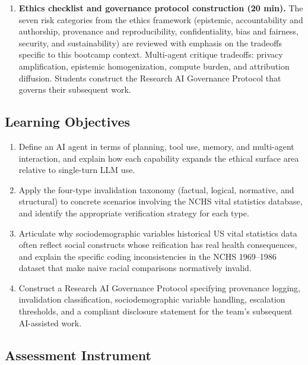 \begin{enumerate}
    \item \textbf{Ethics checklist and governance protocol
    construction (20 min).} The seven risk categories from the
    ethics framework (epistemic, accountability and authorship,
    provenance and reproducibility, confidentiality, bias and
    fairness, security, and sustainability) are reviewed with
    emphasis on the tradeoffs specific to this bootcamp context.
    Multi-agent critique tradeoffs: privacy amplification, epistemic
    homogenization, compute burden, and attribution diffusion.
    Students construct the Research AI Governance Protocol that
    governs their subsequent work.
\end{enumerate}

\subsection{Learning Objectives}

\begin{enumerate}
    \item Define an AI agent in terms of planning, tool use,
    memory, and multi-agent interaction, and explain how each
    capability expands the ethical surface area relative to
    single-turn LLM use.

    \item Apply the four-type invalidation taxonomy (factual,
    logical, normative, and structural) to concrete scenarios
    involving the NCHS vital statistics database, and identify
    the appropriate verification strategy for each type.

    \item Articulate why sociodemographic variables historical US
    vital statistics data often reflect social constructs whose reification
    has real health consequences, and explain the specific coding
    inconsistencies in the NCHS 1969--1986 dataset that make
    naive racial comparisons normatively invalid.

    \item Construct a Research AI Governance Protocol specifying
    provenance logging, invalidation classification, sociodemographic variable
    handling, escalation thresholds, and a compliant disclosure
    statement for the team's subsequent AI-assisted work.
\end{enumerate}

\subsection{Assessment Instrument}

